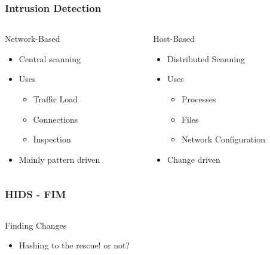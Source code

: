 \documentclass{beamer}
\begin{document}
\begin{frame}[fragile]
  \frametitle{Intrusion Detection}
  \begin{columns}
    \begin{column}{0.5\textwidth}
      Network-Based
      \begin{itemize}
        \item Central scanning
        \item Uses
        \begin{itemize}
          \item Traffic Load
          \item Connections
          \item Inspection
        \end{itemize}
        \item Mainly pattern driven
      \end{itemize}
    \end{column}
    \begin{column}{0.5\textwidth}
      Host-Based
      \begin{itemize}
        \item Distributed Scanning 
        \item Uses
        \begin{itemize}
          \item Processes
          \item Files
          \item Network Configuration
        \end{itemize}
        \item Change driven
      \end{itemize}
    \end{column}
  \end{columns}
\end{frame}

\begin{frame}[fragile]
  \frametitle{HIDS - FIM}
  \begin{columns}
    \begin{column}{1\textwidth}
      Finding Changes
      \begin{itemize}
        \item Hashing to the rescue! \pause or not?
      \end{itemize}
    \end{column}
  \end{columns}
\end{frame}
\end{document}
